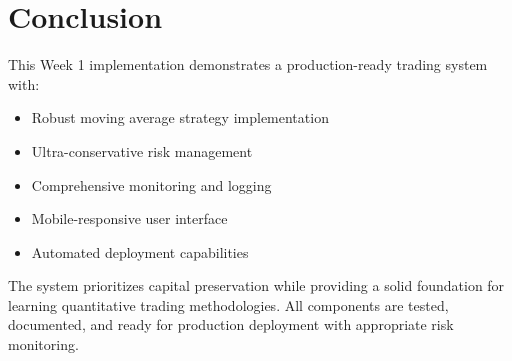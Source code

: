 \documentclass[12pt,a4paper]{article}
\begin{document}
\section{Conclusion}

This Week 1 implementation demonstrates a production-ready trading system with:

\begin{itemize}
\item Robust moving average strategy implementation
\item Ultra-conservative risk management
\item Comprehensive monitoring and logging
\item Mobile-responsive user interface
\item Automated deployment capabilities
\end{itemize}

The system prioritizes capital preservation while providing a solid foundation for learning quantitative trading methodologies. All components are tested, documented, and ready for production deployment with appropriate risk monitoring.
\end{document}
